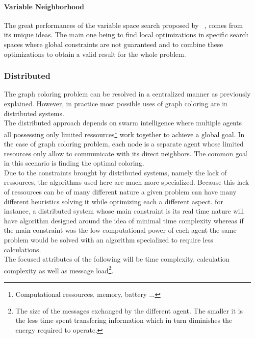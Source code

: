 \documentclass[letterpaper]{article}
\begin{document}
\paragraph{Variable Neighborhood}
The great performances of the variable space search proposed by ~\cite{hertz2008}, comes from its unique ideas. The main one being to find local optimizations in specific search spaces where global constraints are not guaranteed and to combine these optimizations to obtain a valid result for the whole problem.

\subsubsection{Distributed}
The graph coloring problem can be resolved in a centralized manner as previously explained. However, in practice most possible uses of graph coloring are in distributed systems.\\ 

The distributed approach depends on swarm intelligence where multiple agents all possessing only limited ressources\footnote{Computational ressources, memory, battery ...} work together to achieve a global goal. In the case of graph coloring problem, each node is a separate agent whose limited resources only allow to communicate with its direct neighbors. The common goal in this scenario is finding the optimal coloring.\\

Due to the constraints brought by distributed systems, namely the lack of ressources, the algorithms used here are much more specialized. Because this lack of ressources can be of many different nature a given problem can have many different heuristics solving it while optimizing each a different aspect. for instance, a distributed system whose main constraint is its real time nature will have algorithm designed around the idea of minimal time complexity whereas if the main constraint was the low computational power of each agent the same problem would be solved with an algorithm specialized to require less calculations.\\

The focused attributes of the following will be time complexity, calculation complexity as well as message load\footnote{The size of the messages exchanged by the different agent. The smaller it is the less time spent transfering information which in turn diminishes the energy required to operate.}.\\
\end{document}

